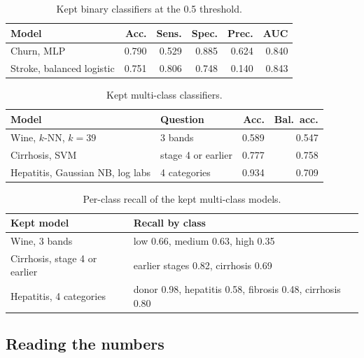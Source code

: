 \begin{table}[H]
  \centering
  \small
  \begin{tabularx}{\textwidth}{@{}Lrrrrr@{}}
    \toprule
    Model & Acc. & Sens. & Spec. & Prec. & AUC \\
    \midrule
    Churn, MLP & 0.790 & 0.529 & 0.885 & 0.624 & 0.840 \\
    Stroke, balanced logistic & 0.751 & 0.806 & 0.748 & 0.140 & 0.843 \\
    \bottomrule
  \end{tabularx}
  \caption{Kept binary classifiers at the 0.5 threshold.}
  \label{tab:binary}
\end{table}

\begin{table}[H]
  \centering
  \small
  \begin{tabularx}{\textwidth}{@{}Llrr@{}}
    \toprule
    Model & Question & Acc. & Bal.\ acc. \\
    \midrule
    Wine, $k$-NN, $k=39$ & 3 bands & 0.589 & 0.547 \\
    Cirrhosis, SVM & stage 4 or earlier & 0.777 & 0.758 \\
    Hepatitis, Gaussian NB, log labs & 4 categories & 0.934 & 0.709 \\
    \bottomrule
  \end{tabularx}
  \caption{Kept multi-class classifiers.}
  \label{tab:multiclass}
\end{table}

\begin{table}[H]
  \centering
  \small
  \begin{tabularx}{\textwidth}{@{}Ll@{}}
    \toprule
    Kept model & Recall by class \\
    \midrule
    Wine, 3 bands & low 0.66, medium 0.63, high 0.35 \\
    Cirrhosis, stage 4 or earlier & earlier stages 0.82, cirrhosis 0.69 \\
    Hepatitis, 4 categories & donor 0.98, hepatitis 0.58, fibrosis 0.48, cirrhosis 0.80 \\
    \bottomrule
  \end{tabularx}
  \caption{Per-class recall of the kept multi-class models.}
  \label{tab:recall}
\end{table}

\subsection{Reading the numbers}

